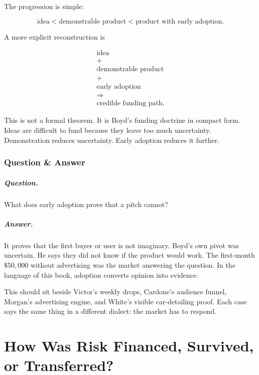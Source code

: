 \documentclass[11pt,oneside]{book}
\begin{document}
The progression is simple:

\begin{equation}
\text{idea}
<
\text{demonstrable product}
<
\text{product with early adoption}.
\end{equation}

A more explicit reconstruction is

\begin{equation}
\begin{gathered}
\text{idea}\\
+\\
\text{demonstrable product}\\
+\\
\text{early adoption}\\
\Longrightarrow\\
\text{credible funding path}.
\end{gathered}
\end{equation}

This is not a formal theorem. It is Boyd's funding doctrine in compact form. Ideas are difficult to fund because they leave too much uncertainty. Demonstration reduces uncertainty. Early adoption reduces it further.

\subsection{Question \& Answer}

\paragraph{Question.}
What does early adoption prove that a pitch cannot?

\paragraph{Answer.}
It proves that the first buyer or user is not imaginary. Boyd's own pivot was uncertain. He says they did not know if the product would work. The first-month \(\$50{,}000\) without advertising was the market answering the question. In the language of this book, adoption converts opinion into evidence.

This should sit beside Victor's weekly drops, Cardone's audience funnel, Morgan's advertising engine, and White's visible car-detailing proof. Each case says the same thing in a different dialect: the market has to respond.

\chapter{How Was Risk Financed, Survived, or Transferred?}
\end{document}
